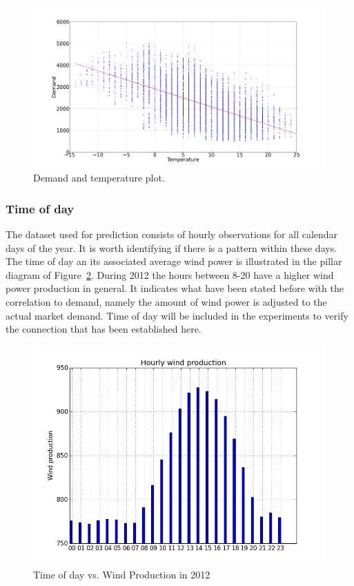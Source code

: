 \begin{figure}[H]
\centering
\includegraphics[width=0.95\linewidth]{billeder/energy_price_plots/consump_temp.png}
\caption{Demand and temperature plot.}
\label{fig:consump_temp_green}
\end{figure}

\subsubsection{Time of day}
\label{sec:greenTOD}
The dataset used for prediction consists of hourly observations for all calendar days of the year. It is worth identifying if there is a pattern within these days. The time of day an its associated average wind power is illustrated in the pillar diagram of Figure~\ref{fig:hourly_wind_production}. During 2012 the hours between 8-20 have a higher wind power production in general. It indicates what have been stated before with the correlation to demand, namely the amount of wind power is adjusted to the actual market demand. Time of day will be included in the experiments to verify the connection that has been established here. 

\begin{figure}[H]
\centering
\includegraphics[width=0.8\linewidth]{billeder/hourly_wind_production.png}
\caption{Time of day vs. Wind Production in 2012}
\label{fig:hourly_wind_production}
\end{figure}

